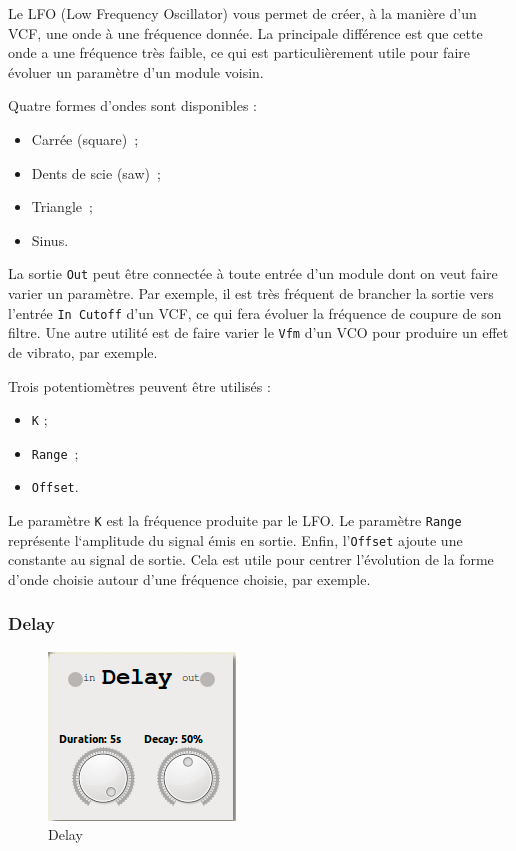 \documentclass[a4paper,oneside,frenchb,12pt]{article}
\begin{document}
Le LFO (Low Frequency Oscillator) vous permet de créer, à la manière
d'un VCF, une onde à une fréquence donnée. La principale différence est
que cette onde a une fréquence très faible, ce qui est particulièrement
utile pour faire évoluer un paramètre d'un module voisin.

Quatre formes d'ondes sont disponibles :

\begin{itemize}
\item
  Carrée (square)~;
\item
  Dents de scie (saw)~;
\item
  Triangle~;
\item
  Sinus.
\end{itemize}
La sortie \verb!Out! peut être connectée à toute entrée d'un module dont
on veut faire varier un paramètre. Par exemple, il est très fréquent de
brancher la sortie vers l'entrée \verb!In Cutoff! d'un VCF, ce qui fera
évoluer la fréquence de coupure de son filtre. Une autre utilité est de
faire varier le \verb!Vfm! d'un VCO pour produire un effet de vibrato,
par exemple.

Trois potentiomètres peuvent être utilisés :

\begin{itemize}
\item
  \verb!K! ;
\item
  \verb!Range!~;
\item
  \verb!Offset!.
\end{itemize}
Le paramètre \verb!K! est la fréquence produite par le LFO. Le paramètre
\verb!Range! représente l`amplitude du signal émis en sortie. Enfin,
l'\verb!Offset! ajoute une constante au signal de sortie. Cela est utile
pour centrer l'évolution de la forme d'onde choisie autour d'une
fréquence choisie, par exemple.

\subsubsection{Delay}

\begin{figure}[h!]
\centering
\includegraphics[scale=0.5]{../img/png/delay.png}
\caption{Delay}
\end{figure}
\end{document}
